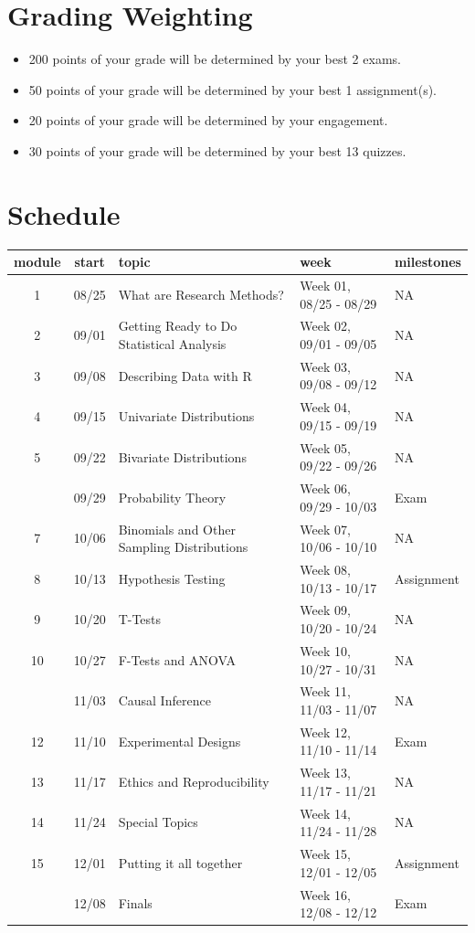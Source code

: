 \documentclass[
]{book}
\providecommand{\tightlist}{%
  \setlength{\itemsep}{0pt}\setlength{\parskip}{0pt}}
\begin{document}
\section*{Grading Weighting}\label{grading-weighting}


\begin{itemize}
\tightlist
\item
  200 points of your grade will be determined by your best 2 exams.
\item
  50 points of your grade will be determined by your best 1 assignment(s).
\item
  20 points of your grade will be determined by your engagement.
\item
  30 points of your grade will be determined by your best 13 quizzes.
\end{itemize}

\section*{Schedule}\label{schedule}


\begin{longtable}{ccp{3in}ll}
\toprule
module & start & topic & week & milestones\\
\midrule
1 & 08/25 & What are Research Methods? & Week 01, 08/25 - 08/29 & NA\\
2 & 09/01 & Getting Ready to Do Statistical Analysis & Week 02, 09/01 - 09/05 & NA\\
3 & 09/08 & Describing Data with R & Week 03, 09/08 - 09/12 & NA\\
4 & 09/15 & Univariate Distributions & Week 04, 09/15 - 09/19 & NA\\
5 & 09/22 & Bivariate Distributions & Week 05, 09/22 - 09/26 & NA\\
\addlinespace
6 & 09/29 & Probability Theory & Week 06, 09/29 - 10/03 & Exam\\
7 & 10/06 & Binomials and Other Sampling Distributions & Week 07, 10/06 - 10/10 & NA\\
8 & 10/13 & Hypothesis Testing & Week 08, 10/13 - 10/17 & Assignment\\
9 & 10/20 & T-Tests & Week 09, 10/20 - 10/24 & NA\\
10 & 10/27 & F-Tests and ANOVA & Week 10, 10/27 - 10/31 & NA\\
\addlinespace
11 & 11/03 & Causal Inference & Week 11, 11/03 - 11/07 & NA\\
12 & 11/10 & Experimental Designs & Week 12, 11/10 - 11/14 & Exam\\
13 & 11/17 & Ethics and Reproducibility & Week 13, 11/17 - 11/21 & NA\\
14 & 11/24 & Special Topics & Week 14, 11/24 - 11/28 & NA\\
15 & 12/01 & Putting it all together & Week 15, 12/01 - 12/05 & Assignment\\
\addlinespace
16 & 12/08 & Finals & Week 16, 12/08 - 12/12 & Exam\\
\bottomrule
\end{longtable}
\end{document}
